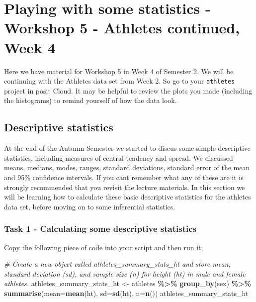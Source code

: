 \documentclass[
]{book}
\newenvironment{Shaded}{\begin{snugshade}}{\end{snugshade}}
\newcommand{\AttributeTok}[1]{\textcolor[rgb]{0.13,0.29,0.53}{#1}}
\newcommand{\CommentTok}[1]{\textcolor[rgb]{0.56,0.35,0.01}{\textit{#1}}}
\newcommand{\FunctionTok}[1]{\textcolor[rgb]{0.13,0.29,0.53}{\textbf{#1}}}
\newcommand{\NormalTok}[1]{#1}
\newcommand{\OtherTok}[1]{\textcolor[rgb]{0.56,0.35,0.01}{#1}}
\newcommand{\SpecialCharTok}[1]{\textcolor[rgb]{0.81,0.36,0.00}{\textbf{#1}}}
\begin{document}
\chapter{Playing with some statistics - Workshop 5 - Athletes continued, Week 4}\label{stats}

Here we have material for Workshop 5 in Week 4 of Semester 2. We will be continuing with the Athletes data set from Week 2. So go to your \texttt{athletes} project in posit Cloud. It may be helpful to review the plots you made (including the histograms) to remind yourself of how the data look.

\section{Descriptive statistics}\label{descriptive-statistics}

At the end of the Autumn Semester we started to discus some simple descriptive statistics, including measures of central tendency and spread. We discussed means, medians, modes, ranges, standard deviations, standard error of the mean and 95\% confidence intervals. If you cant remember what any of these are it is strongly recommended that you revisit the lecture materials. In this section we will be learning how to calculate these basic descriptive statistics for the athletes data set, before moving on to some inferential statistics.

\subsection{Task 1 - Calculating some descriptive statistics}\label{task-1---calculating-some-descriptive-statistics}

Copy the following piece of code into your script and then run it;

\begin{Shaded}
\begin{Highlighting}[]
\CommentTok{\# Create a new object called athletes\_summary\_stats\_ht and store mean, standard deviation (sd), and sample size (n) for height (ht) in male and female athletes.}
\NormalTok{athletes\_summary\_stats\_ht }\OtherTok{\textless{}{-}}\NormalTok{ athletes }\SpecialCharTok{\%\textgreater{}\%} 
  \FunctionTok{group\_by}\NormalTok{(sex) }\SpecialCharTok{\%\textgreater{}\%} 
  \FunctionTok{summarise}\NormalTok{(}\AttributeTok{mean=}\FunctionTok{mean}\NormalTok{(ht),}
            \AttributeTok{sd=}\FunctionTok{sd}\NormalTok{(ht),}
            \AttributeTok{n=}\FunctionTok{n}\NormalTok{())}
\NormalTok{athletes\_summary\_stats\_ht}
\end{Highlighting}
\end{Shaded}
\end{document}
